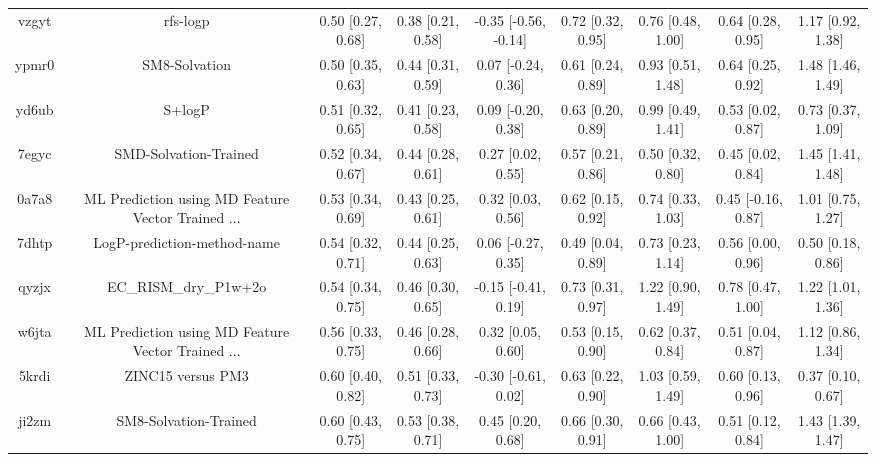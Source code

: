 \documentclass{article}
\begin{document}
\begin{center}
\begin{longtable}{|ccccccccc|}
 vzgyt &                                           rfs-logp &  0.50 [0.27, 0.68] &  0.38 [0.21, 0.58] &  -0.35 [-0.56, -0.14] &  0.72 [0.32, 0.95] &    0.76 [0.48, 1.00] &    0.64 [0.28, 0.95] &     1.17 [0.92, 1.38] \\
 ypmr0 &                                      SM8-Solvation &  0.50 [0.35, 0.63] &  0.44 [0.31, 0.59] &    0.07 [-0.24, 0.36] &  0.61 [0.24, 0.89] &    0.93 [0.51, 1.48] &    0.64 [0.25, 0.92] &     1.48 [1.46, 1.49] \\
 yd6ub &                                             S+logP &  0.51 [0.32, 0.65] &  0.41 [0.23, 0.58] &    0.09 [-0.20, 0.38] &  0.63 [0.20, 0.89] &    0.99 [0.49, 1.41] &    0.53 [0.02, 0.87] &     0.73 [0.37, 1.09] \\
 7egyc &                              SMD-Solvation-Trained &  0.52 [0.34, 0.67] &  0.44 [0.28, 0.61] &     0.27 [0.02, 0.55] &  0.57 [0.21, 0.86] &    0.50 [0.32, 0.80] &    0.45 [0.02, 0.84] &     1.45 [1.41, 1.48] \\
 0a7a8 &  ML Prediction using MD Feature Vector Trained ... &  0.53 [0.34, 0.69] &  0.43 [0.25, 0.61] &     0.32 [0.03, 0.56] &  0.62 [0.15, 0.92] &    0.74 [0.33, 1.03] &   0.45 [-0.16, 0.87] &     1.01 [0.75, 1.27] \\
 7dhtp &                        LogP-prediction-method-name &  0.54 [0.32, 0.71] &  0.44 [0.25, 0.63] &    0.06 [-0.27, 0.35] &  0.49 [0.04, 0.89] &    0.73 [0.23, 1.14] &    0.56 [0.00, 0.96] &     0.50 [0.18, 0.86] \\
 qyzjx &                              EC\_RISM\_dry\_P1w+2o &  0.54 [0.34, 0.75] &  0.46 [0.30, 0.65] &   -0.15 [-0.41, 0.19] &  0.73 [0.31, 0.97] &    1.22 [0.90, 1.49] &    0.78 [0.47, 1.00] &     1.22 [1.01, 1.36] \\
 w6jta &  ML Prediction using MD Feature Vector Trained ... &  0.56 [0.33, 0.75] &  0.46 [0.28, 0.66] &     0.32 [0.05, 0.60] &  0.53 [0.15, 0.90] &    0.62 [0.37, 0.84] &    0.51 [0.04, 0.87] &     1.12 [0.86, 1.34] \\
 5krdi &                                  ZINC15 versus PM3 &  0.60 [0.40, 0.82] &  0.51 [0.33, 0.73] &   -0.30 [-0.61, 0.02] &  0.63 [0.22, 0.90] &    1.03 [0.59, 1.49] &    0.60 [0.13, 0.96] &     0.37 [0.10, 0.67] \\
 ji2zm &                              SM8-Solvation-Trained &  0.60 [0.43, 0.75] &  0.53 [0.38, 0.71] &     0.45 [0.20, 0.68] &  0.66 [0.30, 0.91] &    0.66 [0.43, 1.00] &    0.51 [0.12, 0.84] &     1.43 [1.39, 1.47] \\

\end{longtable}
\end{center}
\end{document}
